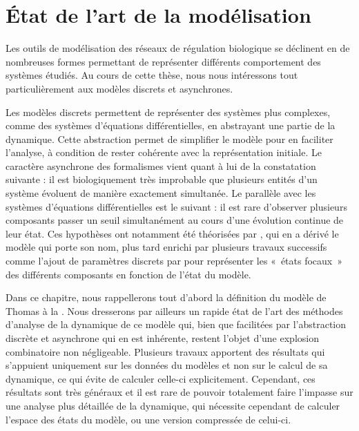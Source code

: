 
\chapter{État de l'art de la modélisation}




Les outils de modélisation des réseaux de régulation biologique se déclinent en de nombreuses
formes permettant de représenter différents comportement des systèmes étudiés.
Au cours de cette thèse, nous nous intéressons tout particulièrement aux modèles discrets
et asynchrones.

Les modèles discrets permettent de représenter des systèmes plus complexes,
comme des systèmes d'équations différentielles,
en abstrayant une partie de la dynamique.
Cette abstraction permet de simplifier le modèle pour en faciliter l'analyse,
à condition de rester cohérente avec la représentation initiale.
Le caractère asynchrone des formalismes vient quant à lui de la constatation suivante :
il est biologiquement très improbable que plusieurs entités d'un système
évoluent de manière exactement simultanée.
Le parallèle avec les systèmes d'équations différentielles est le suivant :
il est rare d'observer plusieurs composants passer un seuil simultanément
au cours d'une évolution continue de leur état.
Ces hypothèses ont notamment été théorisées par ,
qui en a dérivé le modèle qui porte son nom,
plus tard enrichi par plusieurs travaux successifs
comme l'ajout de paramètres discrets par 
pour représenter les «~états focaux~» des différents
composants en fonction de l'état du modèle.

Dans ce chapitre, nous rappellerons tout d'abord la définition du modèle de Thomas
à la .
Nous dresserons par ailleurs un rapide état de l'art des méthodes d'analyse
de la dynamique de ce modèle qui, bien que facilitées par
l'abstraction discrète et asynchrone qui en est inhérente,
restent l'objet d'une explosion combinatoire non négligeable.
Plusieurs travaux apportent des résultats qui s'appuient uniquement sur les données
du modèles et non sur le calcul de sa dynamique,
ce qui évite de calculer celle-ci explicitement.
Cependant, ces résultats sont très généraux et il est rare de pouvoir totalement faire l'impasse
sur une analyse plus détaillée de la dynamique,
qui nécessite cependant de calculer l'espace des états du modèle,
ou une version compressée de celui-ci.

